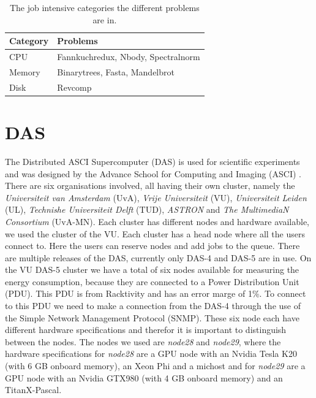 \begin{table}[h]
\centering
\begin{tabular}{|l|l|}
\hline
\textbf{Category} & \textbf{Problems}                           \\ \hline
CPU      & Fannkuchredux, Nbody, Spectralnorm \\ \hline
Memory   & Binarytrees, Fasta, Mandelbrot     \\ \hline
Disk     & Revcomp                            \\ \hline
\end{tabular}
\caption{The job intensive categories the different problems are in.}
\label{tab:problems}
\end{table}

\section{DAS}
The Distributed ASCI Supercomputer (DAS) is used for scientific experiments and was designed by the Advance School for Computing and Imaging (ASCI) \cite{bal2016medium}. There are six organisations involved, all having their own cluster, namely the \textit{Universiteit van Amsterdam} (UvA), \textit{Vrije Universiteit} (VU), \textit{Universiteit Leiden} (UL), \textit{Technishe Universiteit Delft} (TUD), \textit{ASTRON} and \textit{The MultimediaN Consortium} (UvA-MN). Each cluster has different nodes and hardware available, we used the cluster of the VU. Each cluster has a head node where all the users connect to. Here the users can reserve nodes and add jobs to the queue. There are multiple releases of the DAS, currently only DAS-4 and DAS-5 are in use. On the VU DAS-5 cluster we have a total of six nodes available for measuring the energy consumption, because they are connected to a Power Distribution Unit (PDU). This PDU is from Racktivity and has an error marge of 1\%. To connect to this PDU we need to make a connection from the DAS-4 through the use of the Simple Network Management Protocol (SNMP). These six node each have different hardware specifications and therefor it is important to distinguish between the nodes. The nodes we used are \textit{node28} and \textit{node29}, where the hardware specifications for \textit{node28} are a GPU node with an Nvidia Tesla K20 (with 6 GB onboard memory), an Xeon Phi and a michost and for \textit{node29} are a GPU node with an Nvidia GTX980 (with 4 GB onboard memory) and an TitanX-Pascal.


